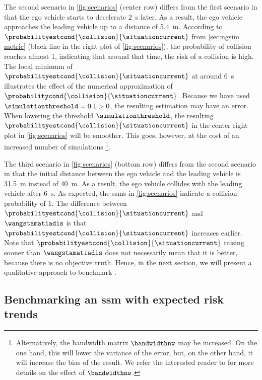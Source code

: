 The second scenario in \cref{fig:scenarios} (center row) differs from the first scenario in that the ego vehicle starts to decelerate \SI{2}{\second} later.
As a result, the ego vehicle approaches the leading vehicle up to a distance of \SI{5.4}{\meter}.
According to $\probabilityestcond{\collision}{\situationcurrent}$ from \cref{sec:ngsim metric} (black line in the right plot of \cref{fig:scenarios}), the probability of collision reaches almost 1, indicating that around that time, the risk of a collision is high.
The local minimum of $\probabilityestcond{\collision}{\situationcurrent}$ at around \SI{6}{\second} illustrates the effect of the numerical approximation of $\probabilitycond{\collision}{\situationcurrent}$.
Because we have used $\simulationthreshold=0.1>0$, the resulting estimation may have an error. 
When lowering the threshold $\simulationthreshold$, the resulting $\probabilityestcond{\collision}{\situationcurrent}$ in the center right plot in \cref{fig:scenarios} will be smoother. 
This goes, however, at the cost of an increased number of simulations \footnote{Alternatively, the bandwidth matrix $\bandwidthnw$ may be increased. 
	On the one hand, this will lower the variance of the error, but, on the other hand, it will increase the bias of the result.
	We refer the interested reader to \autocite{chen2017tutorial} for more details on the effect of $\bandwidthnw$.}.

The third scenario in \cref{fig:scenarios} (bottom row) differs from the second scenario in that the initial distance between the ego vehicle and the leading vehicle is \SI{31.5}{\meter} instead of \SI{40}{\meter}. 
As a result, the ego vehicle collides with the leading vehicle after \SI{6}{\second}.
As expected, the \acp{ssm} in \cref{fig:scenarios} indicate a collision probability of 1.
The difference between $\probabilityestcond{\collision}{\situationcurrent}$ and $\wangstamatiadis$ is that $\probabilityestcond{\collision}{\situationcurrent}$ increases earlier. 
\cstartb Note that $\probabilityestcond{\collision}{\situationcurrent}$ raising sooner than $\wangstamatiadis$ does not necessarily mean that it is better, because there is no objective truth. 
Hence, in the next section, we will present a qualitative approach to benchmark . \cendb



\subsection{Benchmarking an \acs{ssm} with expected risk trends}
\label{sec:trends}

